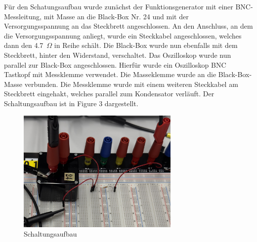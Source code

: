 \documentclass[a4paper,12pt]{article}
\begin{document}
\noindent Für den Schatungsaufbau wurde zunächst der Funktionsgenerator mit einer BNC-Messleitung, mit Masse an die Black-Box Nr. 24 und mit der Versorgungsspannung an das Steckbrett angeschlossen. An den Anschluss, an dem die Versorgungsspannung anliegt, wurde ein Steckkabel angeschlossen, welches dann den 4.7~$\Omega$ in Reihe schält. Die Black-Box wurde nun ebenfalls mit dem Steckbrett, hinter den Widerstand, verschaltet. Das Oszilloskop wurde nun parallel zur Black-Box angeschlossen. Hierfür wurde ein Oszilloskop BNC Tastkopf mit Messklemme verwendet. Die Masseklemme wurde an die Black-Box-Masse verbunden. Die Messklemme wurde mit einem weiteren Steckkabel am Steckbrett eingehakt, welches parallel zum Kondensator verläuft. Der Schaltungsaufbau ist in Figure 3 dargestellt.

\begin{figure}[H]
    \centering
    \includegraphics[width=0.7\textwidth]{../Quellen/Labor2/IMG_3965 - Kopie.jpeg}
\caption{Schaltungsaufbau}
\end{figure}
\end{document}
